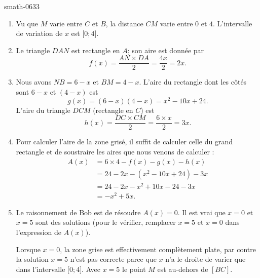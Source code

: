 
\begin{corrige}{smath-0633}

    \begin{enumerate}
        \item
            Vu que \( M\) varie entre \( C\) et \( B\), la distance \( CM\) varie entre \( 0\) et \( 4\). L'intervalle de variation de \( x\) est \( \mathopen[ 0 ; 4 \mathclose]\).
        \item
            Le triangle \( DAN\) est rectangle en \( A\); son aire est donnée par
            \begin{equation}
                f(x)=\frac{ AN\times DA }{ 2 }=\frac{ 4x }{ 2 }=2x.
            \end{equation}
        \item
            Nous avons \( NB=6-x\) et \( BM=4-x\). L'aire du rectangle dont les côtés sont \( 6-x\) et \( (4-x)\) est
            \begin{equation}
                g(x)=(6-x)(4-x)=x^2-10x+24.
            \end{equation}
            L'aire du triangle \( DCM\) (rectangle en \( C\)) est
            \begin{equation}
                h(x)=\frac{ DC\times CM}{ 2 }=\frac{ 6\times x }{2}=3x.
            \end{equation}
        \item
            Pour calculer l'aire de la zone grisé, il suffit de calculer celle du grand rectangle et de soustraire les aires que nous venons de calculer :
            \begin{subequations}
                \begin{align}
                A(x)&=6\times 4-f(x)-g(x)-h(x)\\
                &=24-2x-(x^2-10x+24)-3x\\
                &=24-2x-x^2+10x-24-3x\\
                &=-x^2+5x.
                \end{align}
            \end{subequations}
        \item
            Le raisonnement de Bob est de résoudre \( A(x)=0\). Il est vrai que \( x=0\) et \( x=5\) sont des solutions (pour le vérifier, remplacer \( x=5\) et \( x=0\) dans l'expression de \( A(x)\)).

            Lorsque \( x=0\), la zone grise est effectivement complètement plate, par contre la solution \( x=5\) n'est pas correcte parce que \( x\) n'a le droite de varier que dans l'intervalle \( \mathopen[ 0; 4 \mathclose]\). Avec \( x=5\) le point \( M\) est au-dehors de \( [BC]\).

    \end{enumerate}

\end{corrige}
